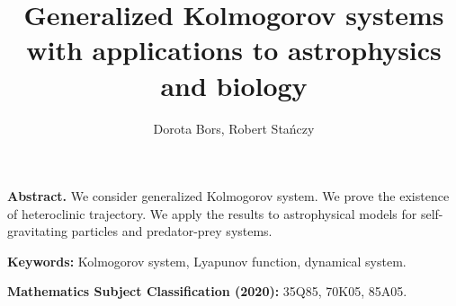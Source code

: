 \documentclass[reqno,10pt]{article}
\theoremstyle{definition}
\numberwithin{equation}{section}
\numberwithin{theorem}{section}
\newenvironment{OMabstract}{\noindent\textbf{Abstract.} }{\medskip}
\newenvironment{OMsubjclass}{\noindent\textbf{Mathematics Subject Classification (2020):} }{\medskip}
\newenvironment{OMkeywords}{\noindent\textbf{Keywords:}  }{\medskip}
\begin{document}
\author{Dorota Bors, Robert Stańczy} %
\title{Generalized Kolmogorov systems with applications to astrophysics and biology}
\maketitle


\begin{OMabstract}
    We consider generalized Kolmogorov system. We prove the existence of heteroclinic trajectory. We apply the results to astrophysical models for self-gravitating particles and predator-prey systems.
\end{OMabstract}

\begin{OMkeywords}
    Kolmogorov system, Lyapunov function, dynamical system.
\end{OMkeywords}

\begin{OMsubjclass}
    35Q85, 70K05, 85A05.
\end{OMsubjclass}


\end{document}
